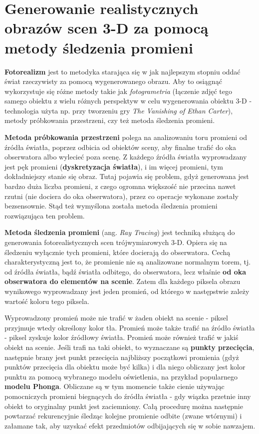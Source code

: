 \section{Generowanie realistycznych obrazów scen 3-D za pomocą metody śledzenia promieni}

\textbf{Fotorealizm} jest to metodyka starająca się w jak najlepszym stopniu oddać świat rzeczywisty za pomocą wygenerowanego obrazu. Aby to osiągnąć wykorzystuje się różne metody takie jak \textit{fotogrametria} (łączenie zdjęć tego samego obiektu z wielu różnych perspektyw w celu wygenerowania obiektu 3-D - technologia użyta np. przy tworzeniu gry \textit{The Vanishing of Ethan Carter}), metody próbkowania przestrzeni, czy też metoda śledzenia promieni. 

\textbf{Metoda próbkowania przestrzeni} polega na analizowaniu toru promieni od źródła światła, poprzez odbicia od obiektów sceny, aby finalne trafić do oka obserwatora albo wylecieć poza scenę. Z każdego źródła światła wyprowadzany jest pęk promieni (\textbf{dyskretyzacja światła}), i im więcej promieni, tym dokładniejszy stanie się obraz. Tutaj pojawia się problem, gdyż generowana jest bardzo duża liczba promieni, z czego ogromna większość nie przecina nawet rzutni (nie dociera do oka obserwatora), przez co operacje wykonane zostały bezsensownie. Stąd też wymyślona została metoda śledzenia promieni rozwiązująca ten problem.

\textbf{Metoda śledzenia promieni} (ang. \textit{Ray Tracing}) jest techniką służącą do generowania fotorealistycznych scen trójwymiarowych 3-D. Opiera się na śledzeniu wyłącznie tych promieni, które docierają do obserwatora. Cechą charakterystyczną jest to, że promienie nie są analizowane normalnym torem, tj. od źródła światła, bądź światła odbitego, do obserwatora, lecz właśnie \textbf{od oka obserwatora do elementów na scenie}. Zatem dla każdego piksela obrazu wynikowego wyprowadzany jest jeden promień, od którego w następstwie zależy wartość koloru tego piksela.

Wyprowadzony promień może nie trafić w żaden obiekt na scenie - piksel przyjmuje wtedy określony kolor tła. Promień może także trafić na źródło światła - piksel zyskuje kolor źródłowy światła. Promień może również trafić w jakiś obiekt na scenie. Jeśli trafi na taki obiekt, to wyznaczane są \textbf{punkty przecięcia}, następnie brany jest punkt przecięcia najbliższy początkowi promienia (gdyż punktów przecięcia dla obiektu może być kilka) i dla niego obliczany jest kolor punktu za pomocą wybranego modelu oświetlenia, na przykład popularnego \textbf{modelu Phonga}. Obliczane są w tym momencie także cienie używając pomocniczych promieni biegnących do źródła światła - gdy wiązka przetnie inny obiekt to oryginalny punkt jest zaciemniony. Całą procedurę można następnie powtarzać rekurencyjnie śledząc kolejne promienie odbite (zwane wtórnymi) i załamane tak, aby uzyskać efekt przedmiotów odbijających się w sobie nawzajem.

